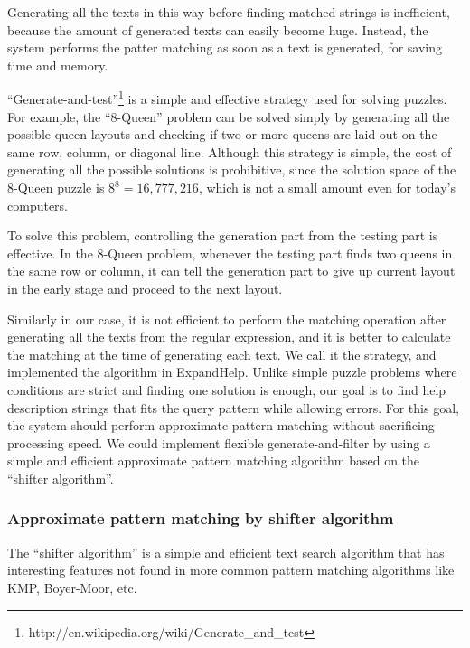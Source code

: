 \documentclass{sigchi}
\def\EH{\textsf{ExpandHelp}}
\begin{document}
Generating all the texts in this way before finding matched strings is
inefficient, because the amount of generated texts can easily become huge.
Instead, the system performs the patter matching as soon as a text is generated,
for saving time and memory.

``Generate-and-test''\footnote{
  {\sf http:{\slash}{\slash}en.wikipedia.org{\slash}wiki{\slash}Generate\_and\_test}
}
is a simple and effective strategy used for solving puzzles.
For example,
the ``8-Queen'' problem can be solved simply by
generating all the possible queen layouts and checking if
two or more queens are laid out on the same row, column, or diagonal line.
Although this strategy is simple, the cost of
generating all the possible solutions is prohibitive, since
the solution space of the 8-Queen puzzle is $8^8 = 16,777,216$,
which is not a small amount even for today's computers.

To solve this problem,
controlling the generation part from the testing part is effective.
In the 8-Queen problem,
whenever the testing part finds two queens in the same row or column,
it can tell the generation part to
give up current layout in the early stage and proceed to the next layout.

Similarly in our case,
it is not efficient to perform the matching operation
after generating all the texts from the regular expression,
and it is better to calculate the matching
at the time of generating each text.
We call it the  strategy,
and implemented the algorithm in {\EH}.
Unlike simple puzzle problems where
conditions are strict and finding one solution is enough,
our goal is to find help description strings
that fits the query pattern while allowing errors.
For this goal,
the system should perform approximate pattern matching
without sacrificing processing speed.
%
We could implement flexible generate-and-filter by using a simple and efficient
approximate pattern matching algorithm based on the ``shifter algorithm''.

\subsubsection{Approximate pattern matching by shifter algorithm}

The ``shifter algorithm''\cite{Wu:1992:FTS:135239.135244}
is a simple and efficient
text search algorithm that has interesting features
not found in more common pattern matching algorithms like
KMP\cite{KMP}, Boyer-Moor\cite{Boyer:1977:FSS:359842.359859}, etc.
\end{document}
